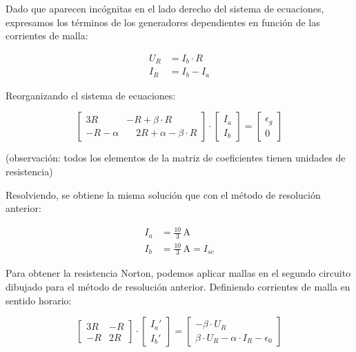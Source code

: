 \vspace{4mm}
Dado que aparecen incógnitas en el lado derecho del sistema de ecuaciones, expresamos los términos de los generadores dependientes en función de las corrientes de malla:

\vspace{-3mm}
\begin{align*}
    U_R &= I_b \cdot R\\[3pt]
    I_R &= I_b - I_a
\end{align*}

Reorganizando el sistema de ecuaciones:

\begin{equation*}
  \begin{bmatrix}
    3R & -R + \beta \cdot R\\[4pt]
    -R - \alpha & \quad 2R + \alpha - \beta \cdot R
  \end{bmatrix} \cdot %
  \begin{bmatrix}
    I_a\\[4pt]
    I_b
  \end{bmatrix} = %
  \begin{bmatrix}
    \epsilon_g\\[4pt]
    0
  \end{bmatrix}
\end{equation*}

\vspace{2mm}
(observación: todos los elementos de la matriz de coeficientes tienen unidades de resistencia)

\vspace{3mm}
Resolviendo, se obtiene la misma solución que con el método de resolución anterior:

\vspace{-3mm}
\begin{align*}
    I_a &= \frac{10}{3}\,\si{\ampere}\\[5pt]
    I_b &= \frac{10}{3}\,\si{\ampere} = I_{sc}
\end{align*}

Para obtener la resistencia Norton, podemos aplicar mallas en el segundo circuito dibujado para el método de resolución anterior. Definiendo corrientes de malla en sentido horario:

\begin{equation*}
  \begin{bmatrix}
    3R & -R\\[4pt]
    -R & 2R
  \end{bmatrix} \cdot %
  \begin{bmatrix}
    I_a'\\[4pt]
    I_b'
  \end{bmatrix} = %
  \begin{bmatrix}
    - \beta \cdot U_R\\[4pt]
    \beta \cdot U_R - \alpha \cdot I_R - \epsilon_0
  \end{bmatrix}
\end{equation*}

